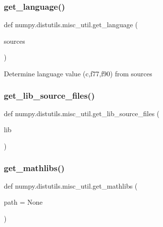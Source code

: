 \subsubsection{\texorpdfstring{get\+\_\+language()}{get\_language()}}
{\footnotesize\ttfamily def numpy.\+distutils.\+misc\+\_\+util.\+get\+\_\+language (\begin{DoxyParamCaption}\item[{}]{sources }\end{DoxyParamCaption})}

\begin{DoxyVerb}Determine language value (c,f77,f90) from sources \end{DoxyVerb}
 \mbox{\label{namespacenumpy_1_1distutils_1_1misc__util_a3fb1af12dafec058834a43f5f5864eb1}} 
\subsubsection{\texorpdfstring{get\+\_\+lib\+\_\+source\+\_\+files()}{get\_lib\_source\_files()}}
{\footnotesize\ttfamily def numpy.\+distutils.\+misc\+\_\+util.\+get\+\_\+lib\+\_\+source\+\_\+files (\begin{DoxyParamCaption}\item[{}]{lib }\end{DoxyParamCaption})}

\mbox{\label{namespacenumpy_1_1distutils_1_1misc__util_a94f49d5b2268a4e9f90636874351582c}} 
\subsubsection{\texorpdfstring{get\+\_\+mathlibs()}{get\_mathlibs()}}
{\footnotesize\ttfamily def numpy.\+distutils.\+misc\+\_\+util.\+get\+\_\+mathlibs (\begin{DoxyParamCaption}\item[{}]{path = {\ttfamily None} }\end{DoxyParamCaption})}

